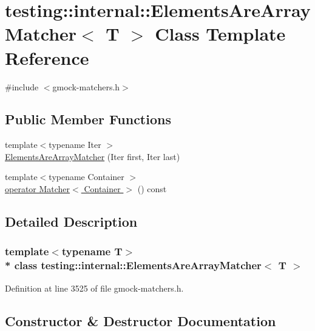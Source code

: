 \hypertarget{classtesting_1_1internal_1_1_elements_are_array_matcher}{}\section{testing\+:\+:internal\+:\+:Elements\+Are\+Array\+Matcher$<$ T $>$ Class Template Reference}
\label{classtesting_1_1internal_1_1_elements_are_array_matcher}


{\ttfamily \#include $<$gmock-\/matchers.\+h$>$}

\subsection*{Public Member Functions}
\begin{DoxyCompactItemize}
\item 
{\footnotesize template$<$typename Iter $>$ }\\\hyperlink{classtesting_1_1internal_1_1_elements_are_array_matcher_aa076a0583c29dc7da6107775bba73be8}{Elements\+Are\+Array\+Matcher} (Iter first, Iter last)
\item 
{\footnotesize template$<$typename Container $>$ }\\\hyperlink{classtesting_1_1internal_1_1_elements_are_array_matcher_a2d1e4ae0b795824282a07aff40e1d480}{operator Matcher$<$ Container $>$} () const 
\end{DoxyCompactItemize}


\subsection{Detailed Description}
\subsubsection*{template$<$typename T$>$\\*
class testing\+::internal\+::\+Elements\+Are\+Array\+Matcher$<$ T $>$}



Definition at line 3525 of file gmock-\/matchers.\+h.



\subsection{Constructor \& Destructor Documentation}
